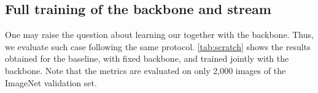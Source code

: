 \subsection{Full training of the backbone and stream}

One may raise the question about learning our \ours together with the backbone.
Thus, we evaluate such case following the same protocol.
\autoref{tab:scratch} shows the results obtained for the baseline, \Ours with fixed backbone, and \Ours trained jointly with the backbone. Note that the metrics are evaluated on only 2,000 images of the ImageNet validation set.





